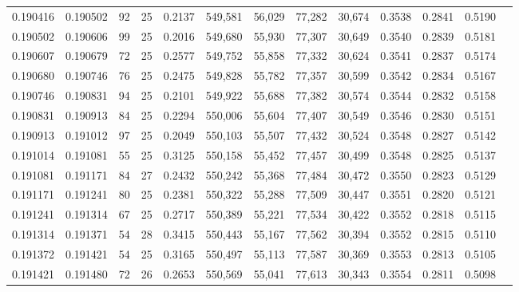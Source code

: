 \begin{tabular}{rrrrrrrrrrrrr}
0.190416 & 0.190502 &    92 &  25 &                                     0.2137 & 549,581 &  56,029 &  77,282 &  30,674 & 0.3538 & 0.2841 & 0.5190 \\
0.190502 & 0.190606 &    99 &  25 &                                     0.2016 & 549,680 &  55,930 &  77,307 &  30,649 & 0.3540 & 0.2839 & 0.5181 \\
0.190607 & 0.190679 &    72 &  25 &                                     0.2577 & 549,752 &  55,858 &  77,332 &  30,624 & 0.3541 & 0.2837 & 0.5174 \\
0.190680 & 0.190746 &    76 &  25 &                                     0.2475 & 549,828 &  55,782 &  77,357 &  30,599 & 0.3542 & 0.2834 & 0.5167 \\
0.190746 & 0.190831 &    94 &  25 &                                     0.2101 & 549,922 &  55,688 &  77,382 &  30,574 & 0.3544 & 0.2832 & 0.5158 \\
0.190831 & 0.190913 &    84 &  25 &                                     0.2294 & 550,006 &  55,604 &  77,407 &  30,549 & 0.3546 & 0.2830 & 0.5151 \\
0.190913 & 0.191012 &    97 &  25 &                                     0.2049 & 550,103 &  55,507 &  77,432 &  30,524 & 0.3548 & 0.2827 & 0.5142 \\
0.191014 & 0.191081 &    55 &  25 &                                     0.3125 & 550,158 &  55,452 &  77,457 &  30,499 & 0.3548 & 0.2825 & 0.5137 \\
0.191081 & 0.191171 &    84 &  27 &                                     0.2432 & 550,242 &  55,368 &  77,484 &  30,472 & 0.3550 & 0.2823 & 0.5129 \\
0.191171 & 0.191241 &    80 &  25 &                                     0.2381 & 550,322 &  55,288 &  77,509 &  30,447 & 0.3551 & 0.2820 & 0.5121 \\
0.191241 & 0.191314 &    67 &  25 &                                     0.2717 & 550,389 &  55,221 &  77,534 &  30,422 & 0.3552 & 0.2818 & 0.5115 \\
0.191314 & 0.191371 &    54 &  28 &                                     0.3415 & 550,443 &  55,167 &  77,562 &  30,394 & 0.3552 & 0.2815 & 0.5110 \\
0.191372 & 0.191421 &    54 &  25 &                                     0.3165 & 550,497 &  55,113 &  77,587 &  30,369 & 0.3553 & 0.2813 & 0.5105 \\
0.191421 & 0.191480 &    72 &  26 &                                     0.2653 & 550,569 &  55,041 &  77,613 &  30,343 & 0.3554 & 0.2811 & 0.5098 \\

\end{tabular}
